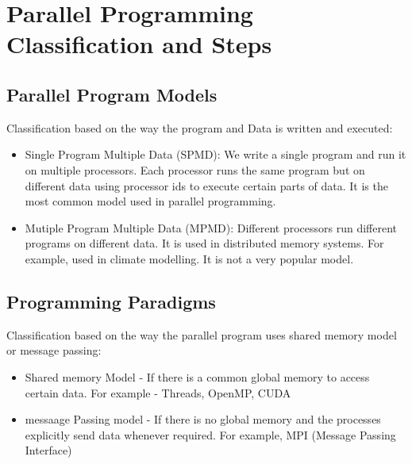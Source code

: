 \documentclass[12pt]{book}
\begin{document}
\newpage

\section{Parallel Programming Classification and Steps}
\subsection{Parallel Program Models}
Classification based on the way the program and Data is written and executed:
\begin{itemize}
    \item Single Program Multiple Data (SPMD): We write a single program and run it on multiple processors. Each processor runs the same program but on different data using processor ids to execute certain parts of data. It is the most common model used in parallel programming.
    \item Mutiple Program Multiple Data (MPMD): Different processors run different programs on different data. It is used in distributed memory systems. For example, used in climate modelling. It is not a very popular model. 
\end{itemize}
\subsection{Programming Paradigms}
Classification based on the way the parallel program uses shared memory model or message passing:
\begin{itemize}
    \item Shared memory Model - If there is a common global memory to access certain data. For example - Threads, OpenMP, CUDA
    \item messaage Passing model - If there is no global memory and the processes explicitly send data whenever required. For example, MPI (Message Passing Interface)
\end{itemize}
\end{document}
